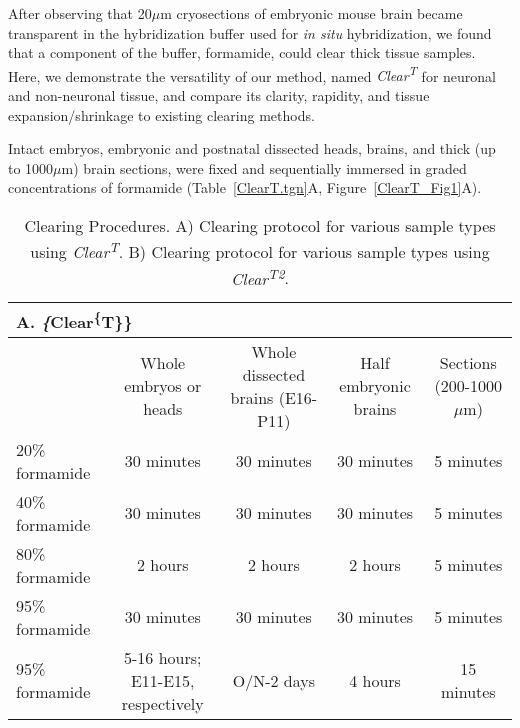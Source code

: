 After observing that 20$\mu$m cryosections of embryonic mouse brain became transparent in the hybridization buffer used for \emph{in situ} hybridization, we found that a component of the buffer, formamide, could clear thick tissue samples.
Here, we demonstrate the versatility of our method, named \emph{Clear\textsuperscript{T}} for neuronal and non-neuronal tissue, and compare its clarity, rapidity, and tissue expansion/shrinkage to existing clearing methods.

Intact embryos, embryonic and postnatal dissected heads, brains, and thick (up to 1000$\mu$m) brain sections, were fixed and sequentially immersed in graded concentrations of formamide (Table~\ref{ClearT.tgn}A, Figure~\ref{ClearT_Fig1}A).
\begin{table}[hbtp]
    \begin{center}
\caption[Clearing Procedures]{Clearing Procedures.
        A) Clearing protocol for various sample types using \emph{Clear\textsuperscript{T}}.
        B) Clearing protocol for various sample types using \emph{Clear\textsuperscript{T2}}.}
\label{my-label}
\begin{tabular}{lcccc}
\multicolumn{5}{l}{A. \emph\{Clear\textsuperscript\{T\}\}}                                                                                                            \\ \hline
                            & Whole embryos or heads                & Whole dissected brains (E16-P11)     & Half embryonic brains     & Sections (200-1000$\mu$m)    \\ \hline
20\% formamide              & 30 minutes                            & 30 minutes                           & 30 minutes                & 5 minutes                    \\
40\% formamide              & 30 minutes                            & 30 minutes                           & 30 minutes                & 5 minutes                    \\
80\% formamide              & 2 hours                               & 2 hours                              & 2 hours                   & 5 minutes                    \\
95\% formamide              & 30 minutes                            & 30 minutes                           & 30 minutes                & 5 minutes                    \\
95\% formamide              & 5-16 hours; E11-E15, respectively     & O/N-2 days                           & 4 hours                   & 15 minutes                   \\ \hline

\end{tabular}
\end{center}
\end{table}
